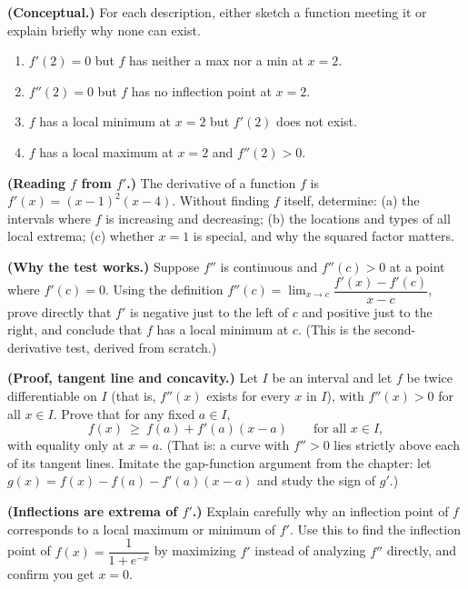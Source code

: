 \begin{exercise}\label{ch16:exE}
\textbf{(Conceptual.)} For each description, either sketch a function meeting it or
explain briefly why none can exist.
\begin{enumerate}
\item $f'(2)=0$ but $f$ has neither a max nor a min at $x=2$.
\item $f''(2)=0$ but $f$ has no inflection point at $x=2$.
\item $f$ has a local minimum at $x=2$ but $f'(2)$ does not exist.
\item $f$ has a local maximum at $x=2$ and $f''(2)>0$.
\end{enumerate}
\end{exercise}

\begin{exercise}\label{ch16:exF}
\textbf{(Reading $f$ from $f'$.)} The derivative of a function $f$ is
$f'(x)=(x-1)^2(x-4)$. Without finding $f$ itself, determine: (a) the intervals
where $f$ is increasing and decreasing; (b) the locations and types of all local
extrema; (c) whether $x=1$ is special, and why the squared factor matters.
\end{exercise}

\begin{exercise}\label{ch16:exG}
\textbf{(Why the test works.)} Suppose $f''$ is continuous and $f''(c)>0$ at a point
where $f'(c)=0$. Using the definition $f''(c)=\lim_{x\to
c}\dfrac{f'(x)-f'(c)}{x-c}$, prove directly that $f'$ is negative just to the left
of $c$ and positive just to the right, and conclude that $f$ has a local minimum at
$c$. (This is the second-derivative test, derived from scratch.)
\end{exercise}

\begin{exercise}\label{ch16:exH}
\textbf{(Proof, tangent line and concavity.)} Let $I$ be an interval and let $f$
be twice differentiable on $I$ (that is, $f''(x)$ exists for every $x$ in $I$),
with $f''(x)>0$ for all $x\in I$. Prove that for any fixed $a\in I$,
\[
f(x)\ \ge\ f(a)+f'(a)(x-a)\qquad\text{for all } x\in I,
\]
with equality only at $x=a$. (That is: a curve with $f''>0$ lies strictly above
each of its tangent lines. Imitate the gap-function argument from the chapter:
let $g(x)=f(x)-f(a)-f'(a)(x-a)$ and study the sign of $g'$.)
\end{exercise}

\begin{exercise}\label{ch16:exI}
\textbf{(Inflections are extrema of $f'$.)} Explain carefully why an inflection
point of $f$ corresponds to a local maximum or minimum of $f'$. Use this to find
the inflection point of $f(x)=\dfrac{1}{1+e^{-x}}$ by maximizing $f'$ instead of
analyzing $f''$ directly, and confirm you get $x=0$.
\end{exercise}

